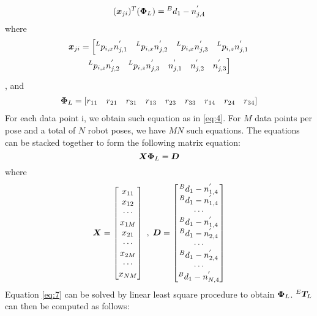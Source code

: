 \begin{equation}
\label{eq:4}
  (\vb*{x}_{ji})  ^T (\vb*{\Phi}_L) = {^B}d_1 -  n^{'}_{j,4}
\end{equation}
where 
\begin{multline}
  \vb*{x}_{ji} = \left[{^L}p_{i,x}n^{'}_{j,1} \quad {^L}p_{i,x}n^{'}_{j,2}\quad {^L}p_{i,x}n^{'}_{j,3}\quad  {^L}p_{i,z}n^{'}_{j,1}\right. \\ 
\left. {^L}p_{i,z}n^{'}_{j,2}\quad {^L}p_{i,z}n^{'}_{j,3} \quad n^{'}_{j,1} \quad n^{'}_{j,2} \quad n^{'}_{j,3} \right]
\end{multline}, 
and
\begin{multline}
  \vb*{\Phi}_L= \left[r_{11} \quad r_{21} \quad r_{31} \quad r_{13} \quad r_{23} \quad r_{33} \quad r_{14} \quad r_{24}  \quad r_{34} \right] 
\end{multline}
For each data point i, we obtain such equation as in \eqref{eq:4}. For $M$ data points per pose and a total of $N$ robot poses, we have $MN$ such equations. The equations can be stacked together to form the following matrix equation:
\begin{equation}
\label{eq:7}
  \vb*{X}   \vb*{\Phi}_L= \vb*{D}
\end{equation}
where 
\begin{equation}
\vb*{X} =\begin{bmatrix}
x_{11} \\ x_{12} \\ \cdots\\x_{1M}\\ x_{21}\\ \cdots\\ x_{2M} \\ \cdots \\ x_{NM}
\end{bmatrix} \;, \; \vb*{D} =\begin{bmatrix}
{^B}d_1 -  n^{'}_{1,4} \\ {^B}d_1 -  n^{'}_{1,4}  \\ \cdots\\ {^B}d_1 -  n^{'}_{1,4}  \\ {^B}d_1 -  n^{'}_{2,4} \\ \cdots\\ {^B}d_1 -  n^{'}_{2,4}  \\ \cdots \\{^B}d_1 -  n^{'}_{N,4} 
\end{bmatrix}
\end{equation}
Equation \eqref{eq:7} can be solved by linear least square procedure to obtain $\vb*{\Phi}_L$. ${^E}\vb*{T}_L$ can then be computed as follows:
